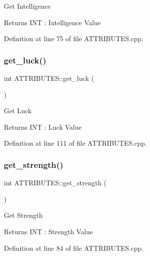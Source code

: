 Get Intelligence 

\begin{DoxyReturn}{Returns}
I\+NT \+: Intelligence Value
\end{DoxyReturn}


Definition at line 75 of file A\+T\+T\+R\+I\+B\+U\+T\+E\+S.\+cpp.

\mbox{\label{class_a_t_t_r_i_b_u_t_e_s_a09fe85866eb5b0c1bc358176e7eab7cc}} 
\subsubsection{\texorpdfstring{get\_luck()}{get\_luck()}}
{\footnotesize\ttfamily int A\+T\+T\+R\+I\+B\+U\+T\+E\+S\+::get\+\_\+luck (\begin{DoxyParamCaption}{ }\end{DoxyParamCaption})}



Get Luck 

\begin{DoxyReturn}{Returns}
I\+NT \+: Luck Value
\end{DoxyReturn}


Definition at line 111 of file A\+T\+T\+R\+I\+B\+U\+T\+E\+S.\+cpp.

\mbox{\label{class_a_t_t_r_i_b_u_t_e_s_a5f4c39740f83ccedc3c50307393fd9d8}} 
\subsubsection{\texorpdfstring{get\_strength()}{get\_strength()}}
{\footnotesize\ttfamily int A\+T\+T\+R\+I\+B\+U\+T\+E\+S\+::get\+\_\+strength (\begin{DoxyParamCaption}{ }\end{DoxyParamCaption})}



Get Strength 

\begin{DoxyReturn}{Returns}
I\+NT \+: Strength Value
\end{DoxyReturn}


Definition at line 84 of file A\+T\+T\+R\+I\+B\+U\+T\+E\+S.\+cpp.

